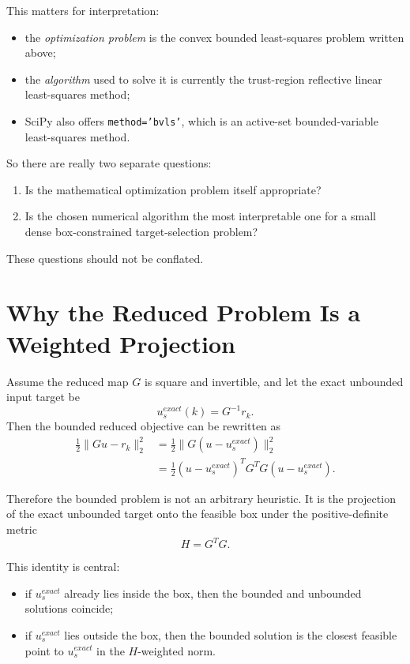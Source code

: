 \documentclass[11pt]{article}
\begin{document}
This matters for interpretation:
\begin{itemize}
\item the \emph{optimization problem} is the convex bounded least-squares problem written above;
\item the \emph{algorithm} used to solve it is currently the trust-region reflective linear least-squares method;
\item SciPy also offers \texttt{method='bvls'}, which is an active-set bounded-variable least-squares method.
\end{itemize}

So there are really two separate questions:
\begin{enumerate}
\item Is the mathematical optimization problem itself appropriate?
\item Is the chosen numerical algorithm the most interpretable one for a small dense box-constrained target-selection problem?
\end{enumerate}

These questions should not be conflated.

\section{Why the Reduced Problem Is a Weighted Projection}

Assume the reduced map $G$ is square and invertible, and let the exact unbounded input target be
\[
u_s^{exact}(k) = G^{-1}r_k.
\]
Then the bounded reduced objective can be rewritten as
\begin{align}
\frac{1}{2}\|Gu-r_k\|_2^2
&= \frac{1}{2}\|G(u-u_s^{exact})\|_2^2 \\
&= \frac{1}{2}(u-u_s^{exact})^T G^T G (u-u_s^{exact}).
\end{align}

Therefore the bounded problem is not an arbitrary heuristic. It is the projection of the exact unbounded target onto the feasible box under the positive-definite metric
\[
H = G^T G.
\]

This identity is central:
\begin{itemize}
\item if $u_s^{exact}$ already lies inside the box, then the bounded and unbounded solutions coincide;
\item if $u_s^{exact}$ lies outside the box, then the bounded solution is the closest feasible point to $u_s^{exact}$ in the $H$-weighted norm.
\end{itemize}
\end{document}
